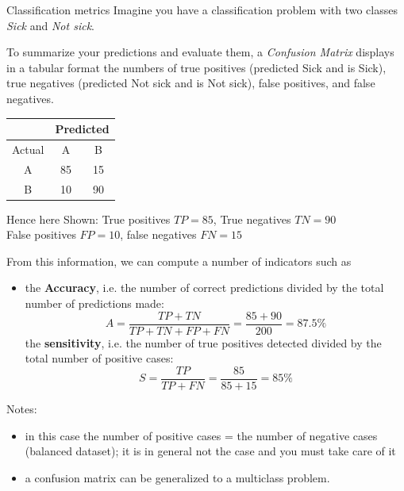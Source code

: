 \begin{frame}[allowframebreaks]{Classification metrics}
  Imagine you have a classification problem with two classes \textit{Sick} and \textit{Not sick}.
  
  To summarize your predictions and evaluate them, a \textit{Confusion Matrix} displays in a tabular format the numbers of true positives (predicted Sick and is Sick), true negatives (predicted Not sick and is Not sick), false positives, and false negatives.

  \begin{center}
    
    \begin{tabular}{c | c c}
      \toprule
      & \multicolumn{2}{c}{Predicted} \\
      \midrule
      Actual & A & B \\
      \midrule
      A & 85 & 15 \\
      B & 10 & 90 \\
      \bottomrule
    \end{tabular}
  \end{center}

Hence here Shown: True positives $TP = 85$, True negatives $TN = 90$  \\
False positives $FP = 10$, false negatives $FN = 15$   

From this information, we can compute a number of indicators such as 
\begin{itemize}
  \item 
 the \textbf{Accuracy}, i.e. the number of correct predictions divided by the total number of predictions made:
  $$A = \frac{TP+TN}{TP+TN+FP+FN} = \frac{85+90}{200} = 87.5 \% $$
  the \textbf{sensitivity},  i.e. the number of true positives detected divided by the total number of positive cases:
  $$S = \frac{TP}{TP+FN} = \frac{85}{85+15} = 85 \% $$
\end{itemize}


Notes: 
\begin{itemize}
  \item in this case the number of positive cases = the number of negative cases (balanced dataset); it is in general not the case and you must take care of it
  \item a confusion matrix can be generalized to a multiclass problem.
\end{itemize}

\end{frame}

